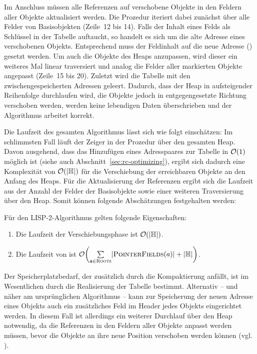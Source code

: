 \newpage

Im Anschluss müssen alle Referenzen auf verschobene Objekte in den Feldern aller Objekte aktualisiert werden.
Die Prozedur  iteriert dabei zunächst über alle Felder von Basisobjekten (Zeile~12 bis 14).
Falls der Inhalt  eines Felds als Schlüssel in der Tabelle auftaucht, so handelt es sich um die alte Adresse eines verschobenen Objekts.
Entsprechend muss der Feldinhalt auf die neue Adresse () gesetzt werden.
Um auch die Objekte des Heaps anzupassen, wird dieser ein weiteres Mal linear traversiert und analog die Felder aller markierten Objekte angepasst (Zeile~15 bis 20).
Zuletzt wird die Tabelle mit den zwischengespeicherten Adressen geleert.
Dadurch, dass der Heap in aufsteigender Reihenfolge durchlaufen wird, die Objekte jedoch in entgegengesetzte Richtung verschoben werden, werden keine lebendigen Daten überschrieben und der Algorithmus arbeitet korrekt.

Die Laufzeit des gesamten Algorithmus lässt sich wie folgt einschätzen:
Im schlimmsten Fall läuft der Zeiger  in der Prozedur  über den gesamten Heap.
Davon ausgehend, dass das Hinzufügen eines Adresspaares zur Tabelle  in $\mathcal{O}(1)$ möglich ist  (siehe auch Abschnitt~\ref{sec:rc-optimizing}), ergibt sich dadurch eine Komplexität von $\mathcal{O}(\left\lvert\mathbb{H}\right\rvert)$ für die Verschiebung der erreichbaren Objekte an den Anfang des Heaps.
Für die Aktualisierung der Referenzen ergibt sich die Laufzeit aus der Anzahl der Felder der Basisobjekte sowie einer weiteren Traversierung über den Heap.
Somit können folgende Abschätzungen festgehalten werden:

\begin{mybox}
\begin{satz}
	Für den LISP-2-Algorithmus gelten folgende Eigenschaften:
	\begin{enumerate}[(1)]
		\item Die Laufzeit der Verschiebungsphase ist $\mathcal{O}(|\mathbb{H}|)$.
		\item Die Laufzeit von  ist $\oh\enb{\sum\limits_{\Var{a} \in \Roots}^{} \abs{\Fields(a)} + \abs{\HeapSize}}$.
	\end{enumerate}
\end{satz}
\end{mybox}

Der Speicherplatzbedarf, der zusätzlich durch die Kompaktierung anfällt, ist im Wesentlichen durch die Realisierung der Tabelle  bestimmt.
Alternativ -- und näher am ursprünglichen Algorithmus -- kann zur Speicherung der neuen Adresse eines Objekts auch ein zusätzliches Feld im Header jedes Objekts eingerichtet werden.
In diesem Fall ist allerdings ein weiterer Durchlauf über den Heap notwendig, da die Referenzen in den Feldern aller Objekte anpasst werden müssen, bevor die Objekte an ihre neue Position verschoben werden können (vgl. \cite[S. 16]{morikawa2013}).

